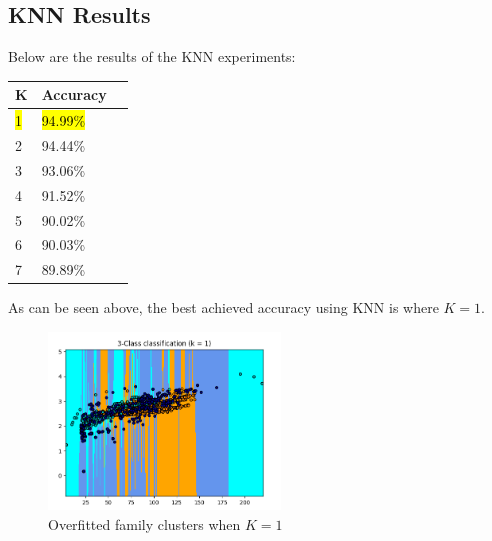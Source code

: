 \documentclass[12pt]{article}
\begin{document}
  \subsection{KNN Results}
  Below are the results of the KNN experiments:
  \begin{table}[H]
    \centering
  \begin{tabular}{|l|l|l|}
    \hline \textbf{K} & \textbf{Accuracy} \\\hline \hline
    \hl{1}                   &      \hl{94.99\%}  \\\hline
    2                   &      94.44\%  \\\hline
    3                   &      93.06\%  \\\hline
    4                   &      91.52\%  \\\hline
    5                   &      90.02\%  \\\hline
    6                   &      90.03\%  \\\hline
    7                   &      89.89\%  \\\hline
  \end{tabular}
  \end{table}  
  As can be seen above, the best achieved accuracy using KNN is where $K=1$.
  
          \begin{figure}[H]
          \centering
          \includegraphics[width=0.55\textwidth]{k1.png}
          \caption{Overfitted family clusters when $K=1$}
          \end{figure}
 
\end{document}
